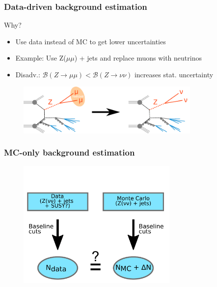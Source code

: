 


\begin{frame}
  \frametitle{Data-driven background estimation}
  \begin{block}{Why?}
  \begin{itemize}
    \item Use data instead of MC to get lower uncertainties
    \item Example: Use Z($\mu \mu$) + jets and replace muons with neutrinos
    \item Disadv.: $\mathcal{B}(Z \rightarrow \mu \mu) < \mathcal{B}(Z \rightarrow \nu \nu)$ increases stat. uncertainty 
  \end{itemize}
  \end{block}
  \begin{figure}[H]
    \centering
    \includegraphics[width=0.8\textwidth]{figures/zmumu}
  \end{figure}
\end{frame}

\begin{frame}
  \frametitle{MC-only background estimation}
  \begin{figure}[H]
    \centering
    \includegraphics[width=0.7\textwidth,height=0.8\textheight,keepaspectratio]{figures/mc_znunu}
  \end{figure}
\end{frame}

